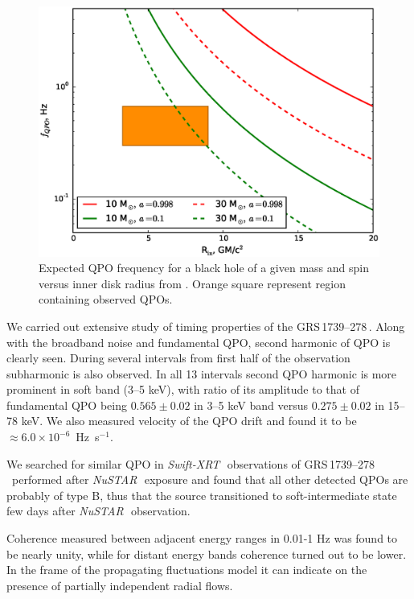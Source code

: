 \documentclass[a4paper,fleqn,usenatbib]{mnras}
\def\grs{{GRS\,1739--278\,}}
\def\swiftx{{\em Swift-XRT\,}}
\def\nustar{{\em NuSTAR\,}}
\begin{document}
\begin{figure}
        \includegraphics[width=\columnwidth]{qpoconstr_v03.eps}
        \caption{Expected QPO frequency for a black hole of a given mass and spin versus inner disk radius from \protect\cite{ingram14}. Orange square represent region containing observed QPOs.}
        \label{fig:qpoconstr}
\end{figure}

We carried out extensive study of timing properties of the \grs. 
Along with the broadband noise and fundamental QPO, second harmonic of QPO is clearly seen. 
During several intervals from first half of the observation subharmonic is also observed. 
In all 13 intervals second QPO harmonic is more prominent in soft band (3--5 keV), with ratio of its amplitude to that of fundamental QPO being $0.565\pm0.02$ in 3--5 keV band versus $0.275\pm0.02$ in 15--78 keV.
We also measured velocity of the QPO drift and found it to be $\approx6.0\times10^{-6}$~Hz~s$^{-1}$. 

We searched for similar QPO in \swiftx\, observations of \grs\ performed after \nustar\, exposure and found that all other detected QPOs are probably of type B, thus that the source transitioned to soft-intermediate state few days after \nustar\ observation.

Coherence measured between adjacent energy ranges in 0.01-1 Hz was found to be nearly unity, while for distant energy bands coherence turned out to be lower. 
In the frame of the propagating fluctuations model it can indicate on the presence of partially independent radial flows.
\end{document}
